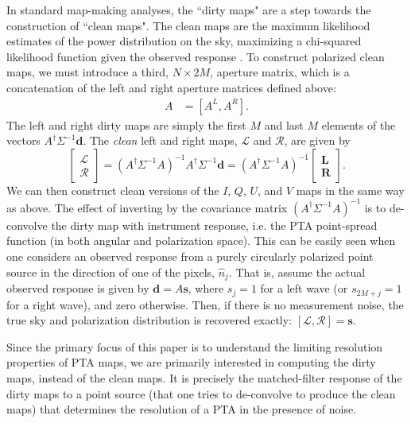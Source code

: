 \documentclass[%
 reprint,
nofootinbib,
 amsmath,amssymb,
 aps,
]{revtex4-2}
\begin{document}
In standard map-making analyses, the ``dirty maps" are a step towards the construction of ``clean maps". The clean maps are the maximum likelihood estimates of the power distribution on the sky, maximizing a chi-squared likelihood function given the observed response \citep{2001A&A...374..358D, Dodelson, Grunthal2025}. To construct polarized clean maps, we must introduce a third, $N \times 2M$, aperture matrix, which is a concatenation of the left and right aperture matrices defined above:
\begin{align}
    A &= [ A^L, A^R].
\end{align}
The left and right dirty maps are simply the first $M$ and last $M$ elements of the vectors $A^\dagger \Sigma^{-1} \mathbf{d}$. The \textit{clean} left and right maps, $\mathbf{\mathcal{L}}$ and $\mathbf{\mathcal{R}}$, are given by
\begin{equation}
    \begin{bmatrix}
        \mathbf{\mathcal{L}}\\
        \mathbf{\mathcal{R}}
    \end{bmatrix} =
    (A^\dagger \Sigma^{-1} A)^{-1} A^\dagger \Sigma^{-1} \mathbf{d} 
    = (A^\dagger \Sigma^{-1} A)^{-1}
    \begin{bmatrix}
        \mathbf{L}\\
        \mathbf{R}
    \end{bmatrix}.
\end{equation}
We can then construct clean versions of the $I$, $Q$, $U$, and $V$ maps in the same way as above. The effect of inverting by the covariance matrix $(A^\dagger \Sigma^{-1} A)^{-1}$ is to de-convolve the dirty map with instrument response, i.e. the PTA point-spread function (in both angular and polarization space). This can be easily seen when one considers an observed response from a purely circularly polarized point source in the direction of one of the pixels, $\hat{n}_j$. That is, assume the actual observed response is given by $\mathbf{d} = A \mathbf{s}$, where $s_j = 1$ for a left wave (or $s_{2M + j} = 1$ for a right wave), and zero otherwise. Then, if there is no measurement noise, the true sky and polarization distribution is recovered exactly: $[\mathcal{L}, \mathcal{R}] = \mathbf{s}$.

Since the primary focus of this paper is to understand the limiting resolution properties of PTA maps, we are primarily interested in computing the dirty maps, instead of the clean maps. It is precisely the matched-filter response of the dirty maps to a point source (that one tries to de-convolve to produce the clean maps) that determines the resolution of a PTA in the presence of noise. 
\end{document}
